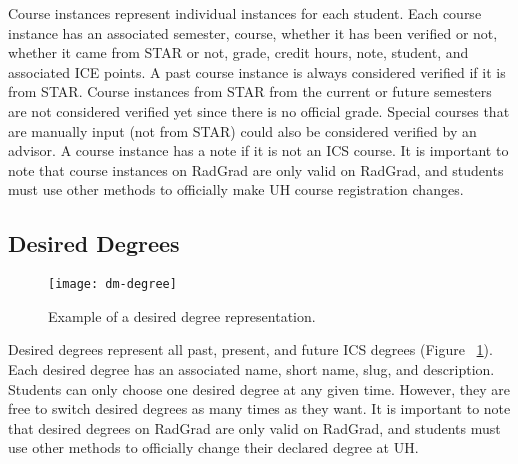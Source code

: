 Course instances represent individual instances for each student. Each course instance has an associated semester, course, whether it has been verified or not, whether it came from STAR or not, grade, credit hours, note, student, and associated ICE points. A past course instance is always considered verified if it is from STAR. Course instances from STAR from the current or future semesters are not considered verified yet since there is no official grade. Special courses that are manually input (not from STAR) could also be considered verified by an advisor. A course instance has a note if it is not an ICS course. It is important to note that course instances on RadGrad are only valid on RadGrad, and students must use other methods to officially make UH course registration changes.

\subsection{Desired Degrees}
\begin{figure}[htbp!]
\centering
\texttt{[image: dm-degree]}
\caption{Example of a desired degree representation.}
\label{desired-degree}
\end{figure}
Desired degrees represent all past, present, and future ICS degrees (Figure ~\ref{desired-degree}). Each desired degree has an associated name, short name, slug, and description. Students can only choose one desired degree at any given time. However, they are free to switch desired degrees as many times as they want. It is important to note that desired degrees on RadGrad are only valid on RadGrad, and students must use other methods to officially change their declared degree at UH. 

